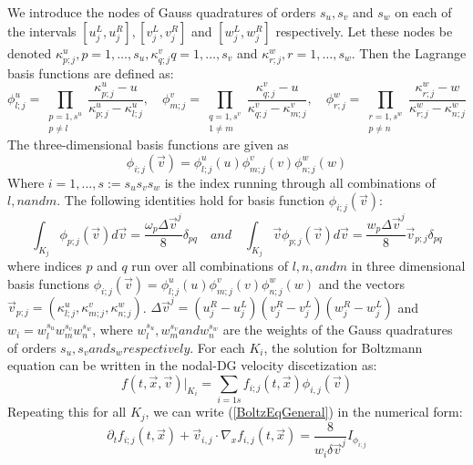 \documentclass{article}
\begin{document}
We introduce the nodes of Gauss quadratures of orders $s_u, s_v$ and $s_w$ on each of the intervals $[u^L_j,u^R_j], [v^L_j,v^R_j]$ and $[w^L_j, w^R_j]$ respectively. Let these nodes be denoted $\kappa^u_{p;j}, p=1,\dots,s_u, \kappa^v_{q;j} q=1,\dots,s_v$ and $\kappa^w_{r;j}, r=1,\dots,s_w$. Then the Lagrange basis functions are defined as:
\begin{equation*}
\phi^u_{l;j} = \prod_{\substack{p=1,s^u \\ p \neq l}}\frac{\kappa^u_{p;j} - u}{\kappa^u_{p;j} - \kappa^u_{l;j}}, \quad \phi^v_{m;j} = \prod_{\substack{q=1,s^v \\ 1 \neq m}}\frac{\kappa^v_{q;j} - u}{\kappa^v_{q;j} - \kappa^v_{m;j}}, \quad \phi^w_{r;j} = \prod_{\substack{r=1,s^w \\ p \neq n}}\frac{\kappa^w_{r;j} - w}{\kappa^w_{r;j} - \kappa^w_{n;j}}
\end{equation*}
The three-dimensional basis functions are given as
\begin{equation}
	\phi_{i;j}(\vec{v})= \phi^u_{l;j}(u)\phi^v_{m;j}(v)\phi^w_{n;j}(w)
\end{equation} 
Where $i = 1,\dots,s:=s_us_vs_w$ is the index running through all combinations of $l, n and m$.
The following identities hold for basis function $\phi_{i;j}(\vec{v})$:
\begin{equation}
\int_{K_j}\phi_{p;j}(\vec{v})d\vec{v}= \frac{\omega_p\Delta\vec{v}^j}{8}\delta_{pq} \quad and\quad \int_{K_j}\vec{v}\phi_{p;j}(\vec{v})d\vec{v}= \frac{w_p\Delta\vec{v}^j}{8}\vec{v}_{p;j}\delta_{pq}
\end{equation}
where indices $p$ and $q$ run over all combinations of $l, n, and m$ in three dimensional basis functions $\phi_{i;j}(\vec{v})= \phi^u_{l;j}(u)\phi^v_{m;j}(v)\phi^w_{n;j}(w)$ and the vectors $\vec{v}_{p;j}=(\kappa^u_{l;j},\kappa^v_{m;j},\kappa^w_{n;j})$. $\Delta\vec{v}^j=(u^R_j - u^L_j)(v^R_j - v^L_j)(w^R_j - w^L_j)$ and $w_i = w^{s_u}_lw^{s_v}_mw^{s_w}_n$, where $w^{s_u}_l, w^{s_v}_m and w^{s_w}_n$ are the weights of the Gauss quadratures of orders $s_u, s_v and s_w respectively.$
For each $K_i$, the solution for Boltzmann equation can be written in the nodal-DG velocity discetization as:
\begin{equation}
	f(t,\vec{x},\vec{v})|_{K_i} = \sum_{i=1s}f_{i;j}(t,\vec{x})\phi_{i,j}(\vec{v})
\end{equation}
Repeating this for all $K_j$, we can write (\ref{BoltzEqGeneral}) in the numerical form:
\begin{equation}
\partial_tf_{i;j}(t,\vec{x}) + \vec{v}_{i,j}\cdot\nabla_xf_{i,j}(t,\vec{x}) = \frac{8}{w_i\delta\vec{v}^j}I_{\phi_{i;j}}
\end{equation}
\end{document}
